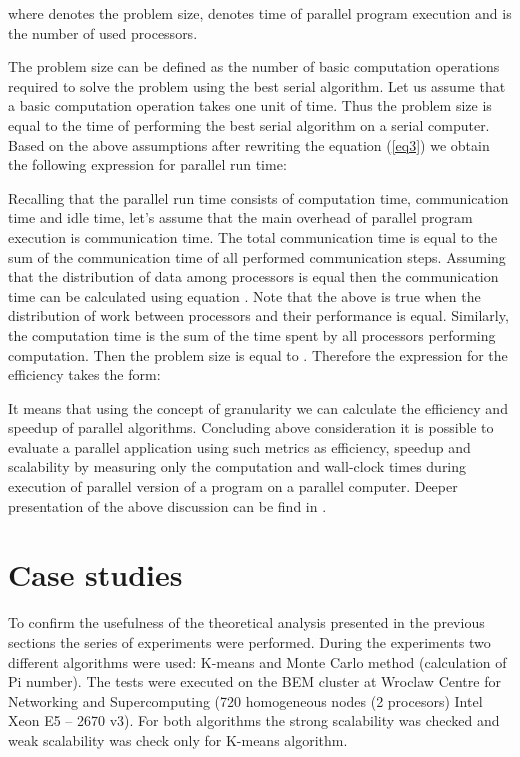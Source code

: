 \documentclass[runningheads]{llncs}
\begin{document}
\noindent where  denotes the problem size,  denotes time
of parallel program execution and  is the number of used processors.

The problem size can be defined as the number of basic computation operations required to solve the problem using the best serial algorithm. Let us assume that a basic computation operation takes one unit of time. Thus the problem size is equal to the time of performing the best serial algorithm on a serial computer. Based
on the above assumptions after rewriting the equation (\ref{eq3}) we obtain the following expression for parallel run time:



Recalling that the parallel run time consists of computation time, communication time and idle time, let's assume that the main overhead of parallel program execution is communication time.
The total communication time is equal to the sum of the communication time of all performed communication steps. Assuming that the distribution of data among processors is equal then the communication time can be calculated using equation . Note that the above is true
when the distribution of work between processors and their
performance is equal. Similarly, the computation time is the sum
of the time spent by all processors performing computation. Then
the problem size  is equal to . Therefore the expression for the efficiency takes the form: 



It means that using the concept of granularity we can calculate the efficiency
and speedup of parallel algorithms. Concluding above consideration it is possible to evaluate a parallel application using such metrics as efficiency, speedup and scalability by measuring only the computation and wall-clock times during execution of parallel version of a program on a parallel computer. Deeper presentation of the above discussion can be find in \cite{kwiatkowski_2}.

\section{Case studies}
To confirm the usefulness of the theoretical analysis presented in the previous
sections the series of experiments were performed. During the experiments two different algorithms were
used: K-means and Monte Carlo method (calculation of Pi number). The tests were executed on the BEM cluster at Wroclaw Centre for Networking and Supercomputing (720 homogeneous nodes (2 procesors) Intel Xeon E5 – 2670 v3).  
For both algorithms the strong scalability was checked and weak scalability was check only for K-means algorithm.
\end{document}
